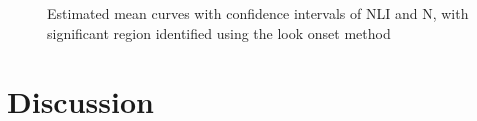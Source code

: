 \documentclass{article}
\begin{document}
\begin{figure}[H]
    \centering
    \caption{Estimated mean curves with confidence intervals of NLI and N, with significant region identified using the look onset method}
\label{fig:irldata2}
\end{figure}



\section{Discussion}
\end{document}
